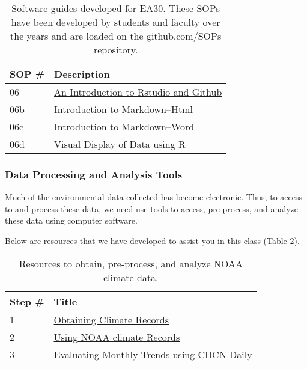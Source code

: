 \documentclass{article}\usepackage[]{graphicx}\usepackage[]{color}
\begin{document}
\begin{table}[h]
\caption{Software guides developed for EA30. These SOPs have been developed by students and faculty over the years and are loaded on the github.com/SOPs repository.}\label{tab:softwareguides}
\centering
\begin{tabular}{ll}\hline
SOP \#    & Description                                 \\\hline\hline
06        & \href{https://github.com/marclos/Climate_Change_Narratives/blob/master/Analysis_SOPs/SOP06_Rstudio_Server_Github.pdf}{An Introduction to Rstudio and Github} \\
06b       & Introduction to Markdown--Html  \\
06c       & Introduction to Markdown--Word  \\
06d       & Visual Display of Data using R  \\
\hline
\end{tabular}
\end{table}

\subsubsection{Data Processing and Analysis Tools}

Much of the environmental data collected has become electronic. Thus, to access to and process these data, we need use tools to access, pre-process, and analyze these data using computer software. 

Below are resources that we have developed to assist you in this class (Table \ref{tab:tools}).

\begin{table}[h]

\caption{Resources to obtain, pre-process, and analyze NOAA climate data.}\label{tab:tools}
\centering
\begin{tabular}{ll}\hline
Step \#    & Title                                 \\\hline\hline
1        & \href{https://github.com/marclos/Climate_Change_Narratives/raw/master/Analysis_Resources/1_Obtaining_Climate_Records.pdf}{Obtaining Climate Records}\\
2        & \href{https://github.com/marclos/Climate_Change_Narratives/raw/master/Analysis_Resources/2_Using_NOAA_Climate_Records.pdf}{Using NOAA climate Records}\\
3        & \href{https://github.com/marclos/Climate_Change_Narratives/raw/master/Analysis_Resources/3_Evaluating_Monthly_Trends_CHCNDaily.pdf}{Evaluating Monthly Trends using CHCN-Daily}\\
\hline
\end{tabular}
\end{table}
\end{document}
